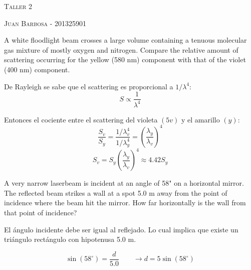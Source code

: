 \documentclass[addpoints,10pt]{exam}
\begin{document}
	\begin{center}
		\LARGE\scshape{Taller 2}
		
		\vspace{1cm}
		\large\scshape{Juan Barbosa - 201325901}
	\end{center}

	\begin{questions}
		{
			\question
			A white floodlight beam crosses a large volume containing a tenuous molecular gas mixture of mostly oxygen and nitrogen. Compare the relative amount of scattering occurring for the yellow (580 nm) component with that of the violet (400 nm) component.
		}
		
		De Rayleigh se sabe que el scattering es proporcional a $1/\lambda^4$:
		\begin{equation}
			S \propto \dfrac{1}{\lambda^4}
		\end{equation}
		
		Entonces el cociente entre el scattering del violeta $(5v)$ y el amarillo $(y)$:
		\begin{equation}
			\dfrac{S_v}{S_y} = \dfrac{1/\lambda_v^4}{1/\lambda_y^4} = \left(\dfrac{\lambda_y}{\lambda_v}\right)^4
		\end{equation}
		\begin{equation}
			S_v = S_y\left(\dfrac{\lambda_y}{\lambda_v}\right)^4 \approx 4.42S_y
		\end{equation}
		
		{
			\question
			A very narrow laserbeam is incident at an angle of 58" on a horizontal mirror. The reflected beam strikes a wall at a spot 5.0 m away from the point of incidence where the beam hit the mirror. How far	horizontally is the wall from that point of incidence?
		}
		
		El \'angulo incidente debe ser igual al reflejado. Lo cual implica que existe un tri\'angulo rect\'angulo con hipotenusa 5.0 m.
		
		\begin{equation}
		\sin(58^\circ) = \dfrac{d}{5.0} \qquad \longrightarrow d = 5\sin(58^\circ)
		\end{equation}
		
	\end{questions}
	
	
\end{document}
